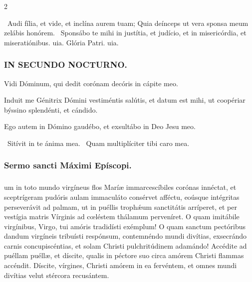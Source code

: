 \documentclass[9pt,twoside]{extarticle}
\begin{document}
\begin{multicols}{2}
{\begin{tightlist}{}
\item {}~Audi fília, et vide, et inclína aurem tuam; \textred{*} Quia deínceps ut vera sponsa meum zelábis honórem. ~Sponsábo te mihi in justítia, et judício, et in misericórdia, et miseratiónibus. uia. Glória Patri. uia.
\end{tightlist}

\subsubsection*{\center \textsc{IN SECUNDO NOCTURNO.}}
\begin{tightlist}{}
\item {} Vidi Dóminum, qui dedit corónam decóris in cápite meo.
\item {} Induit me Génitrix Dómini vestiméntis salútis, et datum est mihi, ut coopériar býssino splendénti, et cándido.
\item {} Ego autem in Dómino gaudébo, et exsultábo in Deo Jesu meo.
\item {}~Sitívit in te ánima mea. ~Quam multiplíciter tibi caro mea.
\end{tightlist}

\subsubsection*{\center Sermo sancti Máximi Epíscopi.}
\subsubsection*{\center {}}
um in toto mundo virgíneus flos Maríæ immarcescíbiles corónas innéctat, et sceptrígeram pudóris aulam immaculáto consérvet afféctu, eoúsque intégritas perseverávit ad palmam, ut in puéllis trophǽum sanctitátis arríperet, et per vestígia matris Vírginis ad cœléstem thálamum perveníret. O quam imitábile virgínibus, Virgo, tui amóris tradidísti exémplum! O quam sanctum pectóribus dandum virgíneis tribuísti respónsum, contemnéndo mundi divítias, exsecrándo carnis concupiscéntias, et solam Christi pulchritúdinem adamándo! Accédite ad puéllam puéllæ, et díscite, qualis in péctore suo circa amórem Christi flammas accéndit. Díscite, vírgines, Christi amórem in ea fervéntem, et omnes mundi divítias velut stércora recusántem.

}
\end{multicols}
\end{document}
